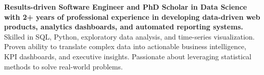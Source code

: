\documentclass[../main.tex]{subfiles}
\begin{document}
\textbf{Results-driven Software Engineer and PhD Scholar in Data Science with 2+ years of professional experience in developing data-driven web products, analytics dashboards, and automated reporting systems.}
Skilled in SQL, Python, exploratory data analysis, and time-series visualization.
Proven ability to translate complex data into actionable business intelligence, KPI dashboards, and executive insights.
Passionate about leveraging statistical methods to solve real-world problems.
\end{document}
